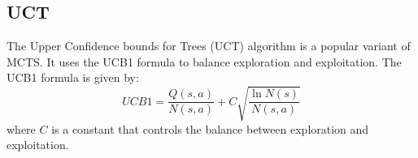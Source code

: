 \documentclass{article}
\begin{document}
\subsection{UCT}
The Upper Confidence bounds for Trees (UCT) algorithm \cite{UCT} is a popular variant of MCTS. It uses the UCB1 formula to balance exploration and exploitation. The UCB1 formula is given by:
\[
    UCB1 = \frac{Q(s,a)}{N(s,a)} + C \sqrt{\frac{\ln N(s)}{N(s,a)}}
\]
where \(C\) is a constant that controls the balance between exploration and exploitation.



\end{document}
